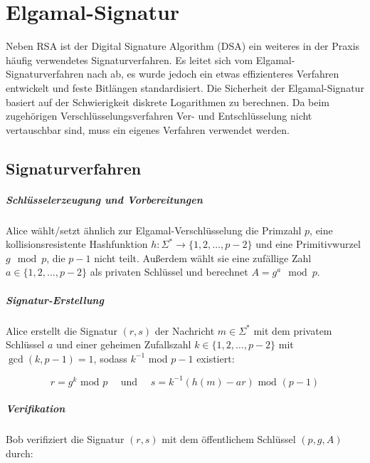 \documentclass[a4paper,12pt,oneside]{scrreprt}
\begin{document}
\chapter{Elgamal-Signatur}

Neben RSA ist der Digital Signature Algorithm (DSA) ein weiteres in der Praxis häufig verwendetes Signaturverfahren. Es leitet sich vom Elgamal-Signaturverfahren nach \cite{1057074} ab, es wurde jedoch ein etwas effizienteres Verfahren entwickelt und feste Bitlängen standardisiert. Die Sicherheit der Elgamal-Signatur basiert auf der Schwierigkeit diskrete Logarithmen zu berechnen. Da beim zugehörigen Verschlüsselungsverfahren Ver- und Entschlüsselung nicht vertauschbar sind, muss ein eigenes Verfahren verwendet werden. 

\section{Signaturverfahren}

\paragraph{Schlüsselerzeugung und Vorbereitungen}

Alice wählt/setzt ähnlich zur Elgamal-Verschlüsselung die Primzahl $p$, eine kollisionsresistente Hashfunktion $h : \Sigma^* \to \{1, 2, \dots, p-2\}$ und eine Primitivwurzel $g \mod p$, die $p-1$ nicht teilt. Außerdem wählt sie eine zufällige Zahl $a \in \{1, 2, \dots, p-2\}$ als privaten Schlüssel und berechnet $A = g^a \mod p$.

\paragraph{Signatur-Erstellung}

Alice erstellt die Signatur $(r,s)$ der Nachricht $m \in \Sigma^*$ mit dem privatem Schlüssel $a$ und einer geheimen Zufallszahl $k \in \{1,2,\dots,p-2\}$ mit $\gcd(k,p-1) = 1$, sodass $k^{-1}$ mod $p-1$ existiert:

\[ r = g^k \text{ mod } p \text{~~~~und~~~~} s = k^{-1}(h(m)-ar) \text{ mod } (p-1)\]

\paragraph{Verifikation}

Bob verifiziert die Signatur $(r,s)$ mit dem öffentlichem Schlüssel $(p, g, A)$ durch:
\end{document}
